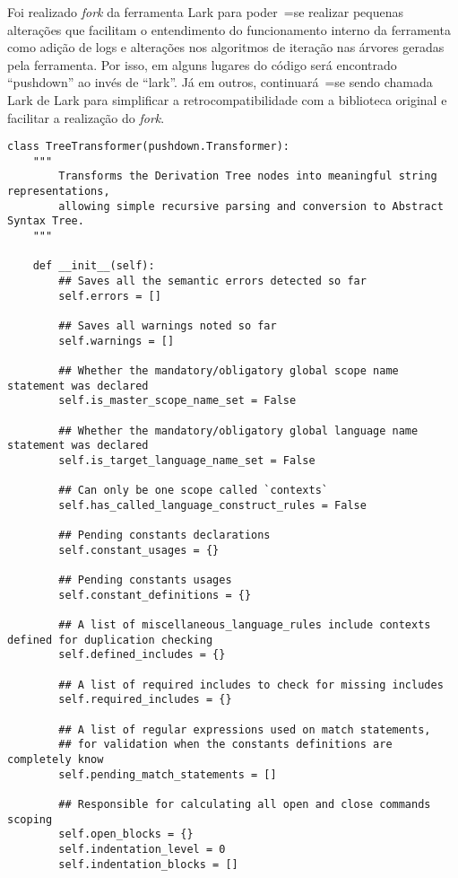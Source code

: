 Foi realizado \textit{fork} da ferramenta Lark para poder~=se realizar pequenas alterações que facilitam o entendimento do funcionamento interno da ferramenta como adição de logs e
alterações nos algoritmos de iteração nas árvores geradas pela ferramenta.
Por isso,
em alguns lugares do código será encontrado ``pushdown'' ao invés de ``lark''.
Já em outros,
continuará~=se sendo chamada Lark de Lark para simplificar a retrocompatibilidade com a biblioteca original e
facilitar a realização do \textit{fork}.
\begin{lstlisting}[caption={Construtor do Analisador Semântico},label={semanticAnalizerConstructor},style=mypython]
class TreeTransformer(pushdown.Transformer):
    """
        Transforms the Derivation Tree nodes into meaningful string representations,
        allowing simple recursive parsing and conversion to Abstract Syntax Tree.
    """

    def __init__(self):
        ## Saves all the semantic errors detected so far
        self.errors = []

        ## Saves all warnings noted so far
        self.warnings = []

        ## Whether the mandatory/obligatory global scope name statement was declared
        self.is_master_scope_name_set = False

        ## Whether the mandatory/obligatory global language name statement was declared
        self.is_target_language_name_set = False

        ## Can only be one scope called `contexts`
        self.has_called_language_construct_rules = False

        ## Pending constants declarations
        self.constant_usages = {}

        ## Pending constants usages
        self.constant_definitions = {}

        ## A list of miscellaneous_language_rules include contexts defined for duplication checking
        self.defined_includes = {}

        ## A list of required includes to check for missing includes
        self.required_includes = {}

        ## A list of regular expressions used on match statements,
        ## for validation when the constants definitions are completely know
        self.pending_match_statements = []

        ## Responsible for calculating all open and close commands scoping
        self.open_blocks = {}
        self.indentation_level = 0
        self.indentation_blocks = []
\end{lstlisting}

